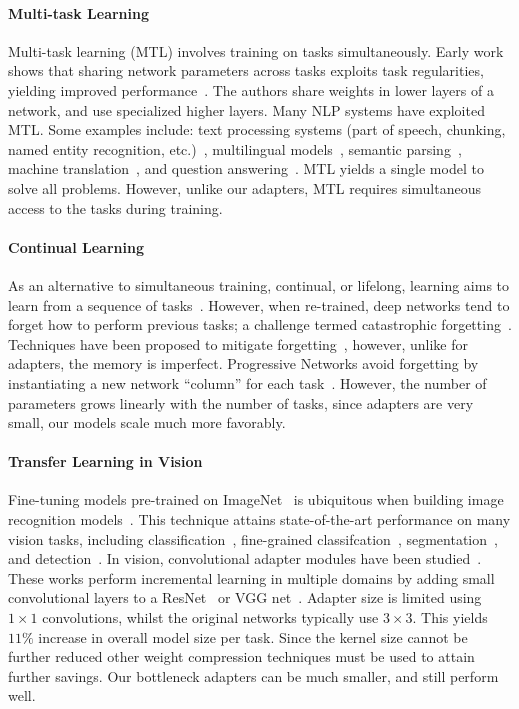 \paragraph{Multi-task Learning}
Multi-task learning (MTL) involves training on tasks simultaneously.
Early work shows that sharing network parameters across tasks exploits task regularities, yielding improved performance~\citep{caruana1997}.
The authors share weights in lower layers of a network, and use specialized higher layers.
Many NLP systems have exploited MTL.
Some examples include: text processing systems (part of speech, chunking, named entity recognition, etc.)~\citep{collobert2008}, multilingual models~\citep{huang2013cross}, semantic parsing~\citep{peng2017}, machine translation~\citep{johnson2017}, and question answering~\citep{choi2017}.
MTL yields a single model to solve all problems.
However, unlike our adapters, MTL requires simultaneous access to the tasks during training.

\paragraph{Continual Learning}
As an alternative to simultaneous training, continual, or lifelong, learning aims to learn from a sequence of tasks~\citep{thrun1998}.
However, when re-trained, deep networks tend to forget how to perform previous tasks; a challenge termed catastrophic forgetting~\citep{mccloskey1989catastrophic,french1999catastrophic}.
Techniques have been proposed to mitigate forgetting~\citep{kirkpatrick2017overcoming,zenke2017continual}, however, unlike for adapters, the memory is imperfect.
Progressive Networks avoid forgetting by instantiating a new network ``column'' for each task~\citep{rusu2016progressive}.
However, the number of parameters grows linearly with the number of tasks,
since adapters are very small, our models scale much more favorably.

\paragraph{Transfer Learning in Vision}
Fine-tuning models pre-trained on ImageNet~\citep{deng2009} is ubiquitous when building image recognition models~\citep{yosinski2014,huh2016makes}.
This technique attains state-of-the-art performance on many vision tasks, including classification~\citep{kornblith2018better}, fine-grained classifcation~\citep{hermans2017}, segmentation~\citep{long2015}, and detection~\citep{girshick2014}.
In vision, convolutional adapter modules have been studied~\citep{rebuffi2017,rebuffi2018,rosenfeld2018incremental}.
These works perform incremental learning in multiple domains by adding small convolutional layers to a ResNet~\citep{he2016} or VGG net~\citep{simonyan2014very}.
Adapter size is limited using $1\times 1$ convolutions, whilst the original networks typically use $3\times 3$.
This yields $11\%$ increase in overall model size per task.
Since the kernel size cannot be further reduced other weight compression techniques must be used to attain further savings.
Our bottleneck adapters can be much smaller, and still perform well.

